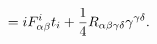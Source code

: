 \begin{equation}
[D_\alpha,D_\beta]=iF^i_{\alpha\beta}t_i+
{1\over 4}R_{\alpha\beta\gamma\delta}\gamma^{\gamma\delta}.
\label{FR}
\end{equation}

